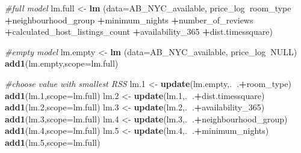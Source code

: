 \documentclass[]{article}
\newenvironment{Shaded}{\begin{snugshade}}{\end{snugshade}}
\newcommand{\CommentTok}[1]{\textcolor[rgb]{0.56,0.35,0.01}{\textit{#1}}}
\newcommand{\DataTypeTok}[1]{\textcolor[rgb]{0.13,0.29,0.53}{#1}}
\newcommand{\DecValTok}[1]{\textcolor[rgb]{0.00,0.00,0.81}{#1}}
\newcommand{\FloatTok}[1]{\textcolor[rgb]{0.00,0.00,0.81}{#1}}
\newcommand{\KeywordTok}[1]{\textcolor[rgb]{0.13,0.29,0.53}{\textbf{#1}}}
\newcommand{\NormalTok}[1]{#1}
\newcommand{\OperatorTok}[1]{\textcolor[rgb]{0.81,0.36,0.00}{\textbf{#1}}}
\newcommand{\OtherTok}[1]{\textcolor[rgb]{0.56,0.35,0.01}{#1}}
\newcommand{\StringTok}[1]{\textcolor[rgb]{0.31,0.60,0.02}{#1}}
\begin{document}
\begin{Shaded}
\begin{Highlighting}[]
\CommentTok{#full model}
\NormalTok{lm.full <-}\StringTok{ }\KeywordTok{lm}\NormalTok{ (}\DataTypeTok{data=}\NormalTok{AB_NYC_available, price_log}\OperatorTok{~}\NormalTok{room_type}
               \OperatorTok{+}\NormalTok{neighbourhood_group}
               \OperatorTok{+}\NormalTok{minimum_nights}
               \OperatorTok{+}\NormalTok{number_of_reviews}
               \OperatorTok{+}\NormalTok{calculated_host_listings_count}
               \OperatorTok{+}\NormalTok{availability_}\DecValTok{365}
               \OperatorTok{+}\NormalTok{dist.timessquare)}

\CommentTok{#empty model}
\NormalTok{lm.empty <-}\StringTok{ }\KeywordTok{lm}\NormalTok{ (}\DataTypeTok{data=}\NormalTok{AB_NYC_available, price_log}\OperatorTok{~}\OtherTok{NULL}\NormalTok{)}
\KeywordTok{add1}\NormalTok{(lm.empty,}\DataTypeTok{scope=}\NormalTok{lm.full)}

\CommentTok{#choose value with smallest RSS}
\NormalTok{lm}\FloatTok{.1}\NormalTok{ <-}\StringTok{ }\KeywordTok{update}\NormalTok{(lm.empty,.}\OperatorTok{~}\NormalTok{.}\OperatorTok{+}\NormalTok{room_type) }
\KeywordTok{add1}\NormalTok{(lm}\FloatTok{.1}\NormalTok{,}\DataTypeTok{scope=}\NormalTok{lm.full)}
\NormalTok{lm}\FloatTok{.2}\NormalTok{ <-}\StringTok{ }\KeywordTok{update}\NormalTok{(lm}\FloatTok{.1}\NormalTok{,.}\OperatorTok{~}\NormalTok{.}\OperatorTok{+}\NormalTok{dist.timessquare)}
\KeywordTok{add1}\NormalTok{(lm}\FloatTok{.2}\NormalTok{,}\DataTypeTok{scope=}\NormalTok{lm.full)}
\NormalTok{lm}\FloatTok{.3}\NormalTok{ <-}\StringTok{ }\KeywordTok{update}\NormalTok{(lm}\FloatTok{.2}\NormalTok{,.}\OperatorTok{~}\NormalTok{.}\OperatorTok{+}\NormalTok{availability_}\DecValTok{365}\NormalTok{)}
\KeywordTok{add1}\NormalTok{(lm}\FloatTok{.3}\NormalTok{,}\DataTypeTok{scope=}\NormalTok{lm.full)}
\NormalTok{lm}\FloatTok{.4}\NormalTok{ <-}\StringTok{ }\KeywordTok{update}\NormalTok{(lm}\FloatTok{.3}\NormalTok{,.}\OperatorTok{~}\NormalTok{.}\OperatorTok{+}\NormalTok{neighbourhood_group)}
\KeywordTok{add1}\NormalTok{(lm}\FloatTok{.4}\NormalTok{,}\DataTypeTok{scope=}\NormalTok{lm.full)}
\NormalTok{lm}\FloatTok{.5}\NormalTok{ <-}\StringTok{ }\KeywordTok{update}\NormalTok{(lm}\FloatTok{.4}\NormalTok{,.}\OperatorTok{~}\NormalTok{.}\OperatorTok{+}\NormalTok{minimum_nights)}
\KeywordTok{add1}\NormalTok{(lm}\FloatTok{.5}\NormalTok{,}\DataTypeTok{scope=}\NormalTok{lm.full)}
\end{Highlighting}
\end{Shaded}
\end{document}
